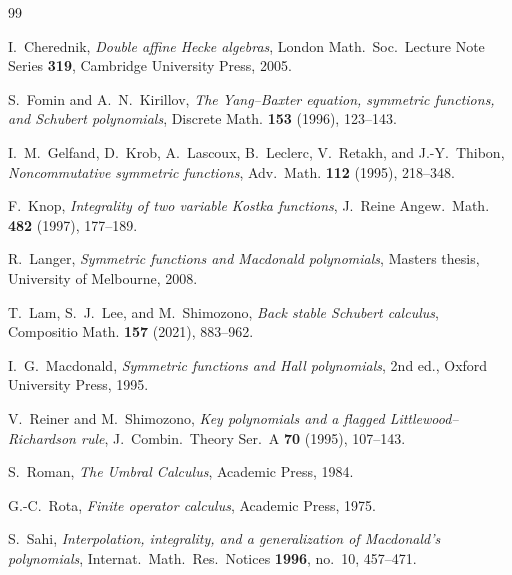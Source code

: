 \documentclass[11pt]{amsart}
\theoremstyle{definition}
\begin{document}

\begin{thebibliography}{99}

I.~Cherednik,
\emph{Double affine Hecke algebras},
London Math.\ Soc.\ Lecture Note Series \textbf{319},
Cambridge University Press, 2005.

S.~Fomin and A.~N.~Kirillov,
\emph{The Yang--Baxter equation, symmetric functions, and Schubert
  polynomials},
Discrete Math. \textbf{153} (1996), 123--143.

I.~M.~Gelfand, D.~Krob, A.~Lascoux, B.~Leclerc, V.~Retakh, and
J.-Y.~Thibon,
\emph{Noncommutative symmetric functions},
Adv.\ Math. \textbf{112} (1995), 218--348.

F.~Knop,
\emph{Integrality of two variable Kostka functions},
J.~Reine Angew.\ Math. \textbf{482} (1997), 177--189.

R.~Langer,
\emph{Symmetric functions and Macdonald polynomials},
Masters thesis, University of Melbourne, 2008.

T.~Lam, S.~J.~Lee, and M.~Shimozono,
\emph{Back stable Schubert calculus},
Compositio Math. \textbf{157} (2021), 883--962.

I.~G.~Macdonald,
\emph{Symmetric functions and Hall polynomials},
2nd ed., Oxford University Press, 1995.

V.~Reiner and M.~Shimozono,
\emph{Key polynomials and a flagged Littlewood--Richardson rule},
J.~Combin.\ Theory Ser.~A \textbf{70} (1995), 107--143.

S.~Roman,
\emph{The Umbral Calculus},
Academic Press, 1984.

G.-C.~Rota,
\emph{Finite operator calculus},
Academic Press, 1975.

S.~Sahi,
\emph{Interpolation, integrality, and a generalization of
  Macdonald's polynomials},
Internat.\ Math.\ Res.\ Notices \textbf{1996}, no.~10, 457--471.

\end{thebibliography}
\end{document}
